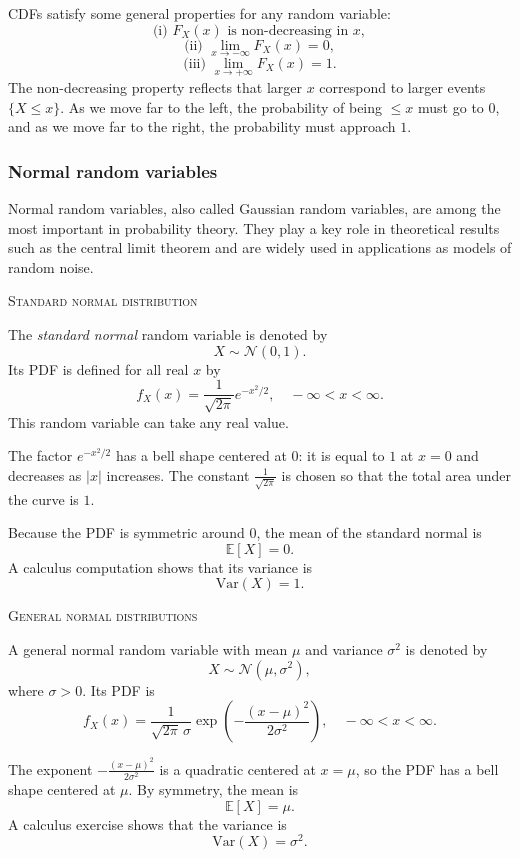 CDFs satisfy some general properties for any random variable:
\[
\text{(i) } F_X(x) \text{ is non-decreasing in } x,
\]
\[
\text{(ii) } \lim_{x \to -\infty} F_X(x) = 0,
\]
\[
\text{(iii) } \lim_{x \to +\infty} F_X(x) = 1.
\]
The non-decreasing property reflects that larger \(x\) correspond to larger events \(\{X \le x\}\).  
As we move far to the left, the probability of being \(\le x\) must go to \(0\), and as we move far to the right, the probability must approach \(1\).

\subsubsection{Normal random variables}

Normal random variables, also called Gaussian random variables, are among the most important in probability theory.  
They play a key role in theoretical results such as the central limit theorem and are widely used in applications as models of random noise.

\bigskip\textsc{Standard normal distribution}

The \textit{standard normal} random variable is denoted by
\[
X \sim \mathcal{N}(0,1).
\]
Its PDF is defined for all real \(x\) by
\[
f_X(x) = \frac{1}{\sqrt{2\pi}} e^{-x^2/2}, \quad -\infty < x < \infty.
\]
This random variable can take any real value.  

The factor \(e^{-x^2/2}\) has a bell shape centered at \(0\): it is equal to \(1\) at \(x=0\) and decreases as \(|x|\) increases.  
The constant \(\frac{1}{\sqrt{2\pi}}\) is chosen so that the total area under the curve is \(1\).

Because the PDF is symmetric around \(0\), the mean of the standard normal is
\[
\mathbb{E}[X] = 0.
\]
A calculus computation shows that its variance is
\[
\mathrm{Var}(X) = 1.
\]

\bigskip\textsc{General normal distributions}

A general normal random variable with mean \(\mu\) and variance \(\sigma^2\) is denoted by
\[
X \sim \mathcal{N}(\mu,\sigma^2),
\]
where \(\sigma > 0\).  
Its PDF is
\[
f_X(x) = \frac{1}{\sqrt{2\pi}\,\sigma}
\exp\!\left(-\frac{(x-\mu)^2}{2\sigma^2}\right), \quad -\infty < x < \infty.
\]

The exponent \(-\frac{(x-\mu)^2}{2\sigma^2}\) is a quadratic centered at \(x=\mu\), so the PDF has a bell shape centered at \(\mu\).  
By symmetry, the mean is
\[
\mathbb{E}[X] = \mu.
\]
A calculus exercise shows that the variance is
\[
\mathrm{Var}(X) = \sigma^2.
\]

